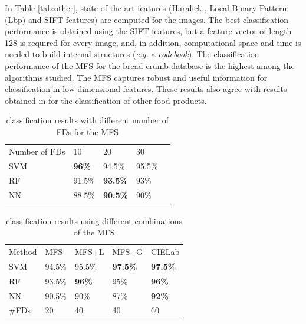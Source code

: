 In Table \ref{tab:other}, state-of-the-art features (Haralick \cite{Haralick73}, Local Binary Pattern (Lbp) \cite{Ojala96} and SIFT \cite{Lowe2004} features) are computed for the images. The best classification performance is obtained using the SIFT features, but a feature vector of length 128 is required for every image, and, in addition, computational space and time is needed to build internal structures ({\em e.g.} a {\em codebook}). The classification performance of the MFS for the bread crumb database is the highest among the algorithms studied. The MFS captures robust and useful information for classification in low dimensional features. These results also agree with results obtained in \cite{Bosch2011} for the classification of other food products.

\begin{table}
\caption{classification results with different number of FDs for the MFS}
\label{tab:number}       %
\begin{tabular}{lllll}
\hline\noalign{\smallskip}
Number of FDs & 10  & 20 & 30 \\
\noalign{\smallskip}\hline\noalign{\smallskip}
SVM & \textbf{96\%} & 94.5\% & 95.5\% \\
RF  & 91.5\% & \textbf{93.5\%} & 93\% \\
NN & 88.5\% & \textbf{90.5\%} & 90\% \\
\noalign{\smallskip}\hline
\end{tabular}
\end{table}


\begin{table}
\caption{classification results using different combinations of the MFS}
\label{tab:mfs}       %
\begin{tabular}{lllll}
\hline\noalign{\smallskip}
Method & MFS & MFS+L & MFS+G & CIELab  \\
\noalign{\smallskip}\hline\noalign{\smallskip}
SVM & 94.5\% & 95.5\% & \textbf{97.5\%} & \textbf{97.5\%} \\
RF  & 93.5\% & \textbf{96\%} & 95\% & \textbf{96\%} \\
NN & 90.5\% & 90\% & 87\% & \textbf{92\%} \\
\noalign{\smallskip}\hline
\#FDs & 20 & 40 & 40 & 60 \\
\hline
\end{tabular}
\end{table}


